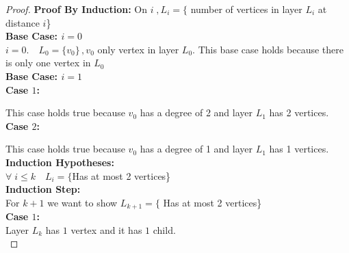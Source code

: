 \documentclass{article}
\theoremstyle{definition}
\theoremstyle{remark}
\theoremstyle{plain}
\begin{document}
\begin{proof}

\textbf{Proof By Induction:} On $i\;, L_i = \{$ number of vertices in layer $L_i$ at distance $i$\}\\

\textbf{Base Case: $i = 0$}\\
$i = 0.\quad L_0 = \{v_0\}\,,v_0$ only vertex in layer $L_0$. This base case holds because there is only one vertex in $L_0$\\

\textbf{Base Case: $i = 1$}\\

\textbf{Case $1$:} \\

This case holds true because $v_0$ has a degree of 2 and layer $L_1$ has 2 vertices.\\

\textbf{Case $2$:}\\

This case holds true because  $v_0$ has a degree of 1 and layer $L_1$ has 1 vertices.\\

\textbf{Induction Hypotheses:}\\ 
$\forall\;i\leq k \quad L_i = \{$Has at most 2 vertices\}\\

\textbf{Induction Step:}\\
For $k+1$ we want to show $L_{k+1} = \{$ Has at most 2 vertices\}\\

\textbf{Case $1$:}\\
Layer $L_k$ has $1$ vertex and it has $1$ child.\\


\end{proof}
\end{document}
